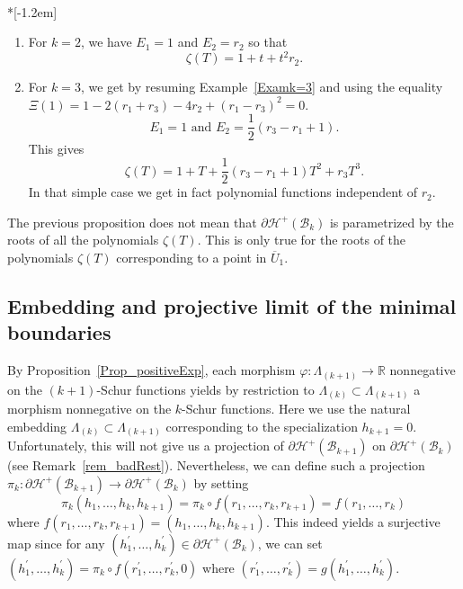 \documentclass[ALCO,ThmDefs,Unicode,epreuves]{cedram}
\begin{document}
\begin{exam}\ \\*[-1.2em]
 

\begin{enumerate}
\item For $k=2$, we have $E_{1}=1$ and $E_{2}=r_{2}$ so that
\[
\zeta(T)=1+t+t^{2}r_{2}.
\]


\item For $k=3$, we get by resuming Example~\ref{Examk=3} and using the
equality $\Xi(1)=1-2\left( r_{1}+r_{3}\right) -4r_{2}+\left( r_{1}%
-r_{3}\right) ^{2}=0$.%
\[
E_{1}=1\text{ and }E_{2}=\frac{1}{2}(r_{3}-r_{1}+1).
\]
This gives%
\[
\zeta(T)=1+T+\frac{1}{2}(r_{3}-r_{1}+1)T^{2}+r_{3}T^{3}.
\]
In that simple case we get in fact polynomial functions independent of $r_{2}$.
\end{enumerate}
\end{exam}

\begin{rema}
The previous proposition does not mean that $\partial\mathcal{H}%
^{+}(\mathcal{B}_{k})$ is parametrized by the roots of all the polynomials
$\zeta(T)$. This is only true for the roots of the polynomials $\zeta(T)$
corresponding to a point in $\overline{U}_{1}$.
\end{rema}

\subsection{Embedding and projective limit of the minimal boundaries}

\label{Subsec_PojLim}By Proposition~\ref{Prop_positiveExp}, each morphism
$\varphi:\Lambda_{(k+1)}\rightarrow\mathbb{R}$ nonnegative on the
$(k+1)$-Schur functions yields by restriction to $\Lambda_{(k)}\subset
\Lambda_{(k+1)}$ a morphism nonnegative on the $k$-Schur functions. Here we
use the natural embedding $\Lambda_{(k)}\subset\Lambda_{(k+1)}$ corresponding
to the specialization $h_{k+1}=0$. Unfortunately, this will not give us a
projection of $\partial\mathcal{H}^{+}(\mathcal{B}_{k+1})$ on $\partial
\mathcal{H}^{+}(\mathcal{B}_{k})$ (see Remark~\ref{rem_badRest}).
Nevertheless, we can define such a projection $\pi_{k}:\partial\mathcal{H}%
^{+}(\mathcal{B}_{k+1})\rightarrow\partial\mathcal{H}^{+}(\mathcal{B}_{k})$ by
setting%
\[
\pi_{k}(h_{1},\ldots,h_{k},h_{k+1})=\pi_{k}\circ f(r_{1},\ldots,r_{k}%
,r_{k+1})=f(r_{1},\ldots,r_{k})
\]
where $f(r_{1},\ldots,r_{k},r_{k+1})=(h_{1},\ldots,h_{k},h_{k+1})$. This
indeed yields a surjective map since for any $(h_{1}^{\prime},\ldots
,h_{k}^{\prime})\in\partial\mathcal{H}^{+}(\mathcal{B}_{k})$, we can set
$(h_{1}^{\prime},\ldots,h_{k}^{\prime})=\pi_{k}\circ f(r_{1}^{\prime}%
,\ldots,r_{k}^{\prime},0)$ where $(r_{1}^{\prime},\ldots,r_{k}^{\prime
})=g(h_{1}^{\prime},\ldots,h_{k}^{\prime})$.
\end{document}
